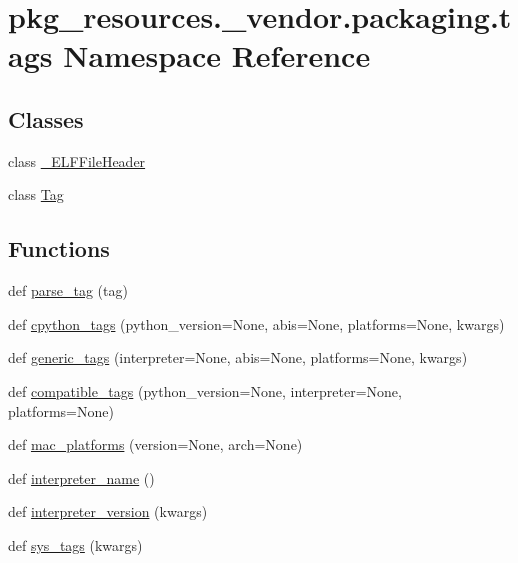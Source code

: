 \hypertarget{namespacepkg__resources_1_1__vendor_1_1packaging_1_1tags}{}\section{pkg\+\_\+resources.\+\_\+vendor.\+packaging.\+tags Namespace Reference}
\label{namespacepkg__resources_1_1__vendor_1_1packaging_1_1tags}
\subsection*{Classes}
\begin{DoxyCompactItemize}
\item 
class \hyperlink{classpkg__resources_1_1__vendor_1_1packaging_1_1tags_1_1__ELFFileHeader}{\+\_\+\+E\+L\+F\+File\+Header}
\item 
class \hyperlink{classpkg__resources_1_1__vendor_1_1packaging_1_1tags_1_1Tag}{Tag}
\end{DoxyCompactItemize}
\subsection*{Functions}
\begin{DoxyCompactItemize}
\item 
def \hyperlink{namespacepkg__resources_1_1__vendor_1_1packaging_1_1tags_a817d46e32760c5daa3f627cef05c4bb0}{parse\+\_\+tag} (tag)
\item 
def \hyperlink{namespacepkg__resources_1_1__vendor_1_1packaging_1_1tags_a637f95a25b9983fe21707d9bdf3f7d9f}{cpython\+\_\+tags} (python\+\_\+version=None, abis=None, platforms=None, kwargs)
\item 
def \hyperlink{namespacepkg__resources_1_1__vendor_1_1packaging_1_1tags_a4148a99666809c2dfcf4cc7771274dd6}{generic\+\_\+tags} (interpreter=None, abis=None, platforms=None, kwargs)
\item 
def \hyperlink{namespacepkg__resources_1_1__vendor_1_1packaging_1_1tags_af67f4266e13e0498857338a270695196}{compatible\+\_\+tags} (python\+\_\+version=None, interpreter=None, platforms=None)
\item 
def \hyperlink{namespacepkg__resources_1_1__vendor_1_1packaging_1_1tags_ac8e711072c821c82b6c4c0e90829bc1f}{mac\+\_\+platforms} (version=None, arch=None)
\item 
def \hyperlink{namespacepkg__resources_1_1__vendor_1_1packaging_1_1tags_a28c81244760f235f7028934246666d33}{interpreter\+\_\+name} ()
\item 
def \hyperlink{namespacepkg__resources_1_1__vendor_1_1packaging_1_1tags_a38446e3d5042ed39166438fec108aadf}{interpreter\+\_\+version} (kwargs)
\item 
def \hyperlink{namespacepkg__resources_1_1__vendor_1_1packaging_1_1tags_a3cdbc6acaa0720ae27edf8494739cdcb}{sys\+\_\+tags} (kwargs)
\end{DoxyCompactItemize}

